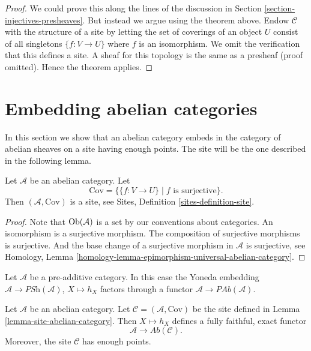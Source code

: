\begin{proof}
We could prove this along the lines of the discussion in
Section \ref{section-injectives-presheaves}. But instead we argue using the
theorem above. Endow $\mathcal{C}$ with the structure of a site by letting the
set of coverings of an object $U$ consist of all singletons $\{f : V \to U\}$
where $f$ is an isomorphism. We omit the verification that this defines a site.
A sheaf for this topology is the same as a presheaf (proof omitted). Hence the
theorem applies.
\end{proof}








\section{Embedding abelian categories}
\label{section-embedding}

\noindent
In this section we show that an abelian category embeds in the
category of abelian sheaves on a site having enough points.
The site will be the one described in the following lemma.

\begin{lemma}
\label{lemma-site-abelian-category}
Let $\mathcal{A}$ be an abelian category.
Let
$$
\text{Cov} = \{\{f : V \to U\} \mid f\text{ is surjective}\}.
$$
Then $(\mathcal{A}, \text{Cov})$ is a site, see
Sites, Definition \ref{sites-definition-site}.
\end{lemma}

\begin{proof}
Note that $\mathop{\rm Ob}\nolimits(\mathcal{A})$ is a set by our conventions
about categories. An isomorphism is a surjective morphism.
The composition of surjective morphisms is surjective.
And the base change of a surjective morphism in $\mathcal{A}$
is surjective, see
Homology, Lemma \ref{homology-lemma-epimorphism-universal-abelian-category}.
\end{proof}

\noindent
Let $\mathcal{A}$ be a pre-additive category. In this case the
Yoneda embedding $\mathcal{A} \to \textit{PSh}(\mathcal{A})$, $X \mapsto h_X$
factors through a functor $\mathcal{A} \to \textit{PAb}(\mathcal{A})$.

\begin{lemma}
\label{lemma-embedding}
Let $\mathcal{A}$ be an abelian category.
Let $\mathcal{C} = (\mathcal{A}, \text{Cov})$ be the
site defined in
Lemma \ref{lemma-site-abelian-category}.
Then $X \mapsto h_X$ defines a fully faithful, exact functor
$$
\mathcal{A} \longrightarrow \textit{Ab}(\mathcal{C}).
$$
Moreover, the site $\mathcal{C}$ has enough points.
\end{lemma}

